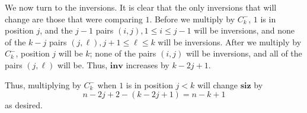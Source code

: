 \documentclass{amsart}[12pt]
\theoremstyle{definition}
\newcommand{\inv}{\mathbf{inv}}
\newcommand{\siz}{\mathbf{siz}}
\begin{document}
We now turn to the inversions.  It is clear that the only inversions that will change are those that were comparing $1$.  Before we multiply by $C_k^-$, $1$ is in position $j$, and the $j-1$ pairs $(i,j), 1\leq i \leq j-1$  will be inversions, and none of the $k-j$ pairs $(j,\ell), j+1\leq \ell \leq k$ will be inversions.  After we multiply by $C_k^-$, position $j$ will be $k$; none of the pairs $(i,j)$ will be inversions, and all of the pairs $(j,\ell)$ will be.  Thus, $\inv$ increases by $k-2j+1$.  

Thus, multiplying by $C_k^-$ when $1$ is in position $j<k$ will change $\siz$ by $$n-2j+2-(k-2j+1)=n-k+1$$ as desired.




  









\end{document}
